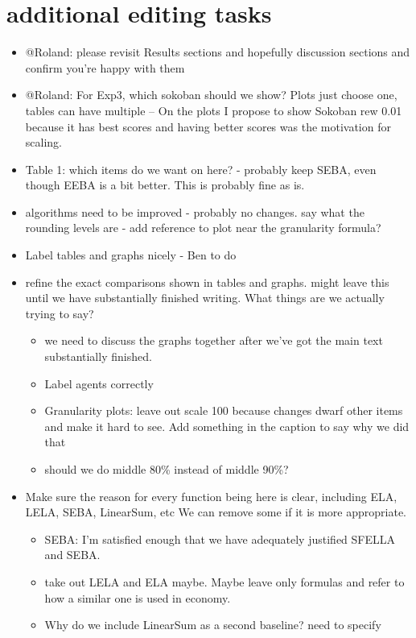 \section*{additional editing tasks}
\begin{itemize}
    \item @Roland: please revisit Results sections and hopefully discussion sections and confirm you're happy with them
    \item @Roland: For Exp3, which sokoban should we show? Plots just choose one, tables can have multiple -- On the plots I propose to show Sokoban rew 0.01 because it has best scores and having better scores was the motivation for scaling.
    \item Table 1: which items do we want on here? - probably keep SEBA, even though EEBA is a bit better. This is probably fine as is.
    \item algorithms need to be improved - probably no changes. say what the rounding levels are - add reference to plot near the granularity formula?
    \item Label tables and graphs nicely - Ben to do
    \item refine the exact comparisons shown in tables and graphs. might leave this until we have substantially finished writing. What things are we actually trying to say?
    \begin{itemize}
        \item we need to discuss the graphs together after we've got the main text substantially finished.
        \item Label agents correctly
        \item Granularity plots: leave out scale 100 because changes dwarf other items and make it hard to see. Add something in the caption to say why we did that
        \item should we do middle 80\% instead of middle 90\%?
    \end{itemize}
    \item Make sure the reason for every function being here is clear, including ELA, LELA, SEBA, LinearSum, etc We can remove some if it is more appropriate.
    \begin{itemize}
        \item SEBA: I'm satisfied enough that we have adequately justified SFELLA and SEBA.
        \item take out LELA and ELA maybe. Maybe leave only formulas and refer to how a similar one is used in economy.
        \item Why do we include LinearSum as a second baseline? need to specify

\end{itemize}
\end{itemize}
